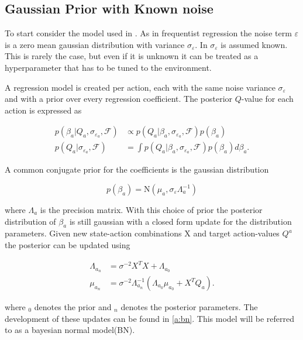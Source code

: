 \subsection{Gaussian Prior with Known noise}

To start consider the model used in \cite{azziz_2018}. As in frequentist regression the noise term $\varepsilon$ is a zero mean gaussian distribution with variance $\sigma_\varepsilon$. In \cite{azziz_2018} $\sigma_\varepsilon$ is assumed known. This is rarely the case, but even if it is unknown it can be treated as a hyperparameter that has to be tuned to the environment. 

A regression model is created per action, each with the same noise variance $\sigma_\varepsilon$ and with a prior over every regression coefficient. The posterior $Q$-value for each action is expressed as 

\begin{align*}
    p(\beta_a |Q_a, \sigma_{\varepsilon_a}, \mathcal{F}) &\propto p(Q_a| \beta_a, \sigma_{\varepsilon_a}, \mathcal{F})p(\beta_a) \\
    p(Q_a|\sigma_{\varepsilon_a}, \mathcal{F}) &= \int p(Q_a|\beta_a, \sigma_{\varepsilon_a}, \mathcal{F}) p(\beta_a)d\beta_a.
\end{align*}

A common conjugate prior for the coefficients is the gaussian distribution 

$$
p(\beta_a) = \text{N}(\mu_a, \sigma_\varepsilon\Lambda_a^{-1}) 
$$

where $\Lambda_a$ is the precision matrix. With this choice of prior the posterior distribution of $\beta_a$ is still gaussian with a closed form update for the distribution parameters. Given new state-action combinations X and target action-values $Q^a$ the posterior can be updated using 

\begin{equation}
    \begin{split}
        \label{eq:known_noise_posterior_update}
        \Lambda_{a_n} & = \sigma^{-2}X^TX + \Lambda_{a_0} \\
        \mu_{a_n}     & = \sigma^{-2}\Lambda_{a_n}^{-1}(\Lambda_{a_0}\mu_{a_0} + X^TQ_a).
    \end{split}
\end{equation}

where $_0$ denotes the prior and $_n$ denotes the posterior parameters. The development of these updates can be found in \ref{a:bn}. This model will be referred to as a bayesian normal model(BN).

